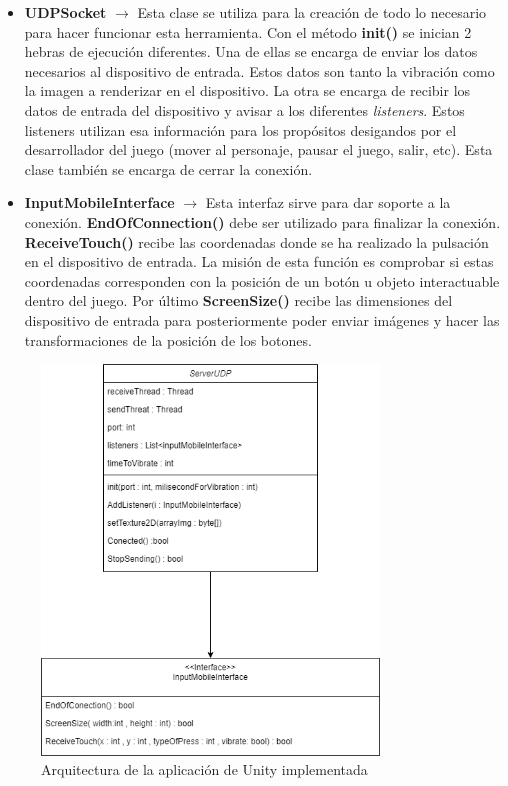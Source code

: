 \begin {itemize}
\item \textbf{UDPSocket} $\rightarrow$ Esta clase se utiliza para la creaci\'on de todo lo necesario para hacer funcionar esta herramienta. Con el m\'etodo \textbf{init()} se inician 2 hebras de ejecuci\'on diferentes. Una de ellas se encarga de enviar los datos necesarios al dispositivo de entrada. Estos datos son tanto la vibraci\'on como la imagen a renderizar en el dispositivo. La otra se encarga de recibir los datos de entrada del dispositivo y avisar a los diferentes \textit{listeners}. Estos listeners utilizan esa informaci\'on para los prop\'ositos desigandos por el desarrollador del juego (mover al personaje, pausar el juego, salir, etc). Esta clase tambi\'en se encarga de cerrar la conexi\'on.
\item \textbf{InputMobileInterface} $\rightarrow$ Esta interfaz sirve para dar soporte a la conexi\'on.\textbf{ EndOfConnection()} debe ser utilizado para finalizar la conexi\'on. \textbf{ReceiveTouch()} recibe las coordenadas donde se ha realizado la pulsaci\'on en el dispositivo de entrada. La misi\'on de esta funci\'on es comprobar si estas coordenadas corresponden con la posici\'on de un bot\'on u objeto interactuable dentro del juego. Por \'ultimo \textbf{ScreenSize()} recibe las dimensiones del dispositivo de entrada para posteriormente poder enviar im\'agenes y hacer las transformaciones de la posici\'on de los botones.
\end {itemize}

\begin{figure}[h]

\centering
\includegraphics[width=0.8\textwidth]{./Imagenes/Bitmap/Arquitectura Unity}
\caption{Arquitectura de la aplicaci\'on de Unity implementada}
\end{figure}

